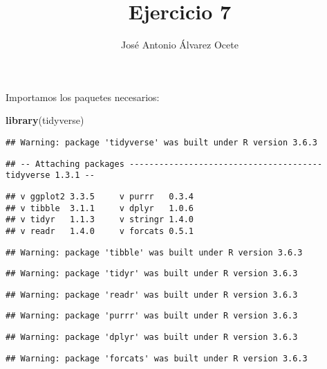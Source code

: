 \documentclass[
]{article}
\title{Ejercicio 7}
\author{José Antonio Álvarez Ocete}
\date{}
\newenvironment{Shaded}{\begin{snugshade}}{\end{snugshade}}
\newcommand{\KeywordTok}[1]{\textcolor[rgb]{0.13,0.29,0.53}{\textbf{#1}}}
\newcommand{\NormalTok}[1]{#1}
\begin{document}
\maketitle

Importamos los paquetes necesarios:

\begin{Shaded}
\begin{Highlighting}[]
\KeywordTok{library}\NormalTok{(tidyverse)}
\end{Highlighting}
\end{Shaded}

\begin{verbatim}
## Warning: package 'tidyverse' was built under R version 3.6.3
\end{verbatim}

\begin{verbatim}
## -- Attaching packages --------------------------------------- tidyverse 1.3.1 --
\end{verbatim}

\begin{verbatim}
## v ggplot2 3.3.5     v purrr   0.3.4
## v tibble  3.1.1     v dplyr   1.0.6
## v tidyr   1.1.3     v stringr 1.4.0
## v readr   1.4.0     v forcats 0.5.1
\end{verbatim}

\begin{verbatim}
## Warning: package 'tibble' was built under R version 3.6.3
\end{verbatim}

\begin{verbatim}
## Warning: package 'tidyr' was built under R version 3.6.3
\end{verbatim}

\begin{verbatim}
## Warning: package 'readr' was built under R version 3.6.3
\end{verbatim}

\begin{verbatim}
## Warning: package 'purrr' was built under R version 3.6.3
\end{verbatim}

\begin{verbatim}
## Warning: package 'dplyr' was built under R version 3.6.3
\end{verbatim}

\begin{verbatim}
## Warning: package 'forcats' was built under R version 3.6.3
\end{verbatim}
\end{document}
